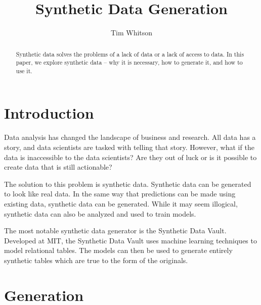 
\title{Synthetic Data Generation}

\author{Tim Whitson}

\renewcommand{\shortauthors}{T. Whitson}

\begin{abstract}
Synthetic data solves the problems of a lack of data or a lack of access
to data. In this paper, we explore synthetic data -- why it is necessary,
how to generate it, and how to use it.
\end{abstract}


\maketitle

\section{Introduction}

Data analysis has changed the landscape of business and research. All data
has a story, and data scientists are tasked with telling that story. However,
what if the data is inaccessible to the data scientists? Are they out of
luck or is it possible to create data that is still actionable?

The solution to this problem is synthetic data. Synthetic data can be generated
to look like real data. In the same way that predictions can be made using
existing data, synthetic data can be generated. While it may seem illogical,
synthetic data can also be analyzed and used to train models.

The most notable synthetic data generator is the Synthetic Data
Vault. Developed at MIT, the Synthetic Data Vault uses machine learning
techniques to model relational tables. The models can then be used to generate
entirely synthetic tables which are true to the form of the originals.\cite{}

\section{Generation}

